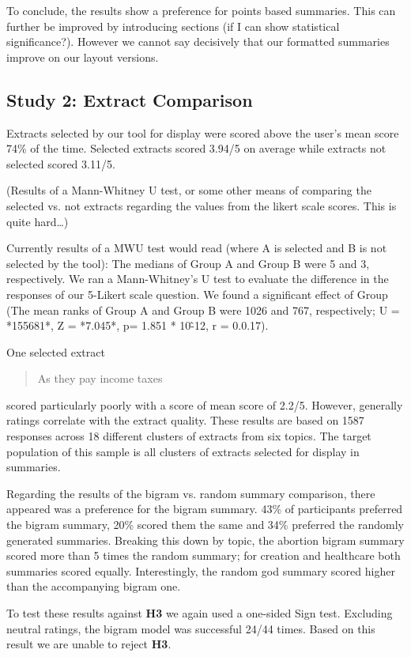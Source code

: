       To conclude, the results show a preference for points based summaries. This can further be improved by introducing sections (if I can show statistical significance?). However we cannot say decisively that our formatted summaries improve on our layout versions.

    \tocless\subsection{Study 2: Extract Comparison}
      Extracts selected by our tool for display were scored above the user's mean score 74\% of the time. Selected extracts scored 3.94/5 on average while extracts not selected scored 3.11/5.

      (Results of a Mann-Whitney U test, or some other means of comparing the selected vs. not extracts regarding the values from the likert scale scores. This is quite hard\dots)

      Currently results of a MWU test would read (where A is selected and B is not selected by the tool): The medians of Group A and Group B were 5 and 3, respectively. We ran a Mann-Whitney's U test to evaluate the difference in the responses of our 5-Likert scale question. We found a significant effect of Group (The mean ranks of Group A and Group B were 1026 and 767, respectively; U = *155681*, Z = *7.045*, p= 1.851 * 10\^-12, r = 0.0.17).

      One selected extract \blockquote{As they pay income taxes} scored particularly poorly with a score of mean score of 2.2/5. However, generally ratings correlate with the extract quality. These results are based on 1587 responses across 18 different clusters of extracts from six topics. The target population of this sample is all clusters of extracts selected for display in summaries.

      Regarding the results of the bigram vs. random summary comparison, there appeared was a preference for the bigram summary. 43\% of participants preferred the bigram summary, 20\% scored them the same and 34\% preferred the randomly generated summaries. Breaking this down by topic, the abortion bigram summary scored more than 5 times the random summary; for creation and healthcare both summaries scored equally. Interestingly, the random god summary scored higher than the accompanying bigram one.

      To test these results against \textbf{H3} we again used a one-sided Sign test. Excluding neutral ratings, the bigram model was successful 24/44 times. Based on this result we are unable to reject \textbf{H3}.

